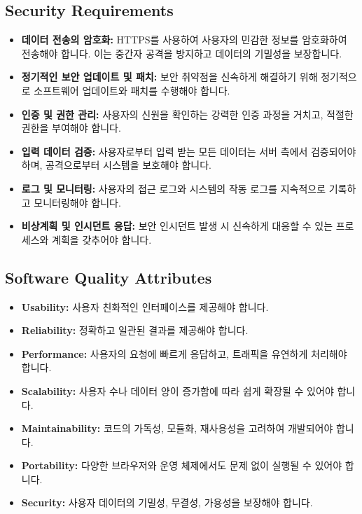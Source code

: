 \documentclass[a4paper, 12pt]{article}
\begin{document}
\subsection{Security Requirements}
\begin{itemize}
    \item \textbf{데이터 전송의 암호화:} HTTPS를 사용하여 사용자의 민감한 정보를 암호화하여 전송해야 합니다. 이는 중간자 공격을 방지하고 데이터의 기밀성을 보장합니다.
    
    \item \textbf{정기적인 보안 업데이트 및 패치:} 보안 취약점을 신속하게 해결하기 위해 정기적으로 소프트웨어 업데이트와 패치를 수행해야 합니다.

    \item \textbf{인증 및 권한 관리:} 사용자의 신원을 확인하는 강력한 인증 과정을 거치고, 적절한 권한을 부여해야 합니다.

    \item \textbf{입력 데이터 검증:} 사용자로부터 입력 받는 모든 데이터는 서버 측에서 검증되어야 하며, 공격으로부터 시스템을 보호해야 합니다.

    \item \textbf{로그 및 모니터링:} 사용자의 접근 로그와 시스템의 작동 로그를 지속적으로 기록하고 모니터링해야 합니다.

    \item \textbf{비상계획 및 인시던트 응답:} 보안 인시던트 발생 시 신속하게 대응할 수 있는 프로세스와 계획을 갖추어야 합니다.
\end{itemize}

\subsection{Software Quality Attributes}
\begin{itemize}
    \item \textbf{Usability:} 사용자 친화적인 인터페이스를 제공해야 합니다.
    
    \item \textbf{Reliability:} 정확하고 일관된 결과를 제공해야 합니다.

    \item \textbf{Performance:} 사용자의 요청에 빠르게 응답하고, 트래픽을 유연하게 처리해야 합니다.

    \item \textbf{Scalability:} 사용자 수나 데이터 양이 증가함에 따라 쉽게 확장될 수 있어야 합니다.

    \item \textbf{Maintainability:} 코드의 가독성, 모듈화, 재사용성을 고려하여 개발되어야 합니다.

    \item \textbf{Portability:} 다양한 브라우저와 운영 체제에서도 문제 없이 실행될 수 있어야 합니다.

    \item \textbf{Security:} 사용자 데이터의 기밀성, 무결성, 가용성을 보장해야 합니다.
\end{itemize}
\end{document}
